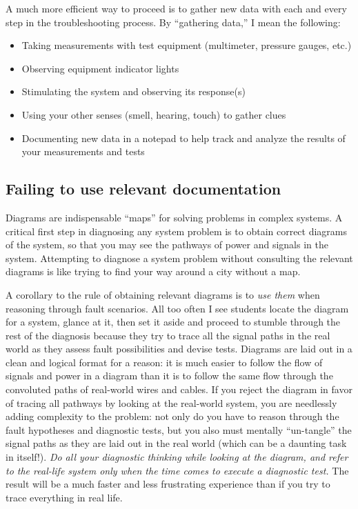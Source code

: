 A much more efficient way to proceed is to gather new data with each and every step in the troubleshooting process.  By ``gathering data,'' I mean the following:

\begin{itemize}
\item Taking measurements with test equipment (multimeter, pressure gauges, etc.)
\item Observing equipment indicator lights
\item Stimulating the system and observing its response(s)
\item Using your other senses (smell, hearing, touch) to gather clues
\item Documenting new data in a notepad to help track and analyze the results of your measurements and tests
\end{itemize}








\filbreak
\subsection{Failing to use relevant documentation}

Diagrams are indispensable ``maps'' for solving problems in complex systems.  A critical first step in diagnosing any system problem is to obtain correct diagrams of the system, so that you may see the pathways of power and signals in the system.  Attempting to diagnose a system problem without consulting the relevant diagrams is like trying to find your way around a city without a map.

A corollary to the rule of obtaining relevant diagrams is to \textit{use them} when reasoning through fault scenarios.  All too often I see students locate the diagram for a system, glance at it, then set it aside and proceed to stumble through the rest of the diagnosis because they try to trace all the signal paths in the real world as they assess fault possibilities and devise tests.  Diagrams are laid out in a clean and logical format for a reason: it is much easier to follow the flow of signals and power in a diagram than it is to follow the same flow through the convoluted paths of real-world wires and cables.  If you reject the diagram in favor of tracing all pathways by looking at the real-world system, you are needlessly adding complexity to the problem: not only do you have to reason through the fault hypotheses and diagnostic tests, but you also must mentally ``un-tangle'' the signal paths as they are laid out in the real world (which can be a daunting task in itself!).  \textit{Do all your diagnostic thinking while looking at the diagram, and refer to the real-life system only when the time comes to execute a diagnostic test.}  The result will be a much faster and less frustrating experience than if you try to trace everything in real life.

